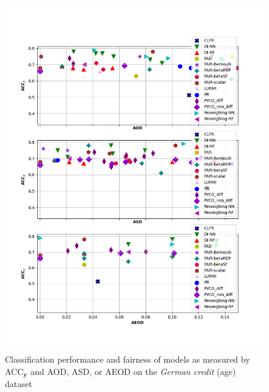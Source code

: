 \documentclass[preprint,12pt]{elsarticle}
\begin{document}
\begin{figure}
	\center
	\includegraphics[angle=0, width=1\textwidth]{Ger_age_all_ACC.png}
	\captionsetup{justification=centering}
	\caption{Classification performance and fairness of models as measured by ACC$_\mathbf{y}$ and AOD, ASD, or AEOD on the \textit{German credit} (age) dataset}
	\label{fig:Ger_age all-acc}
	\vskip -0.2in
\end{figure}
\end{document}
